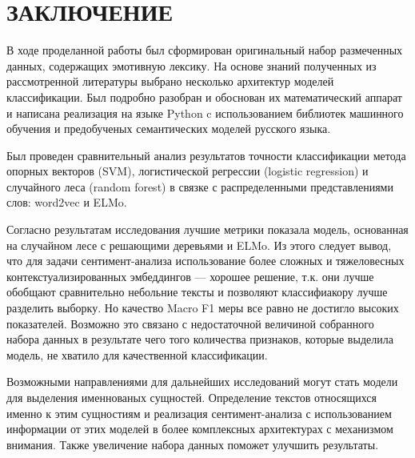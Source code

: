\chapter*{ЗАКЛЮЧЕНИЕ}

В ходе проделанной работы был сформирован оригинальный набор размеченных данных, содержащих эмотивную лексику. На основе знаний полученных из рассмотренной литературы выбрано несколько архитектур моделей классификации. Был подробно разобран и обоснован их математический аппарат и написана реализация на языке Python c использованием библиотек машинного обучения и предобученых семантических моделей русского языка.

\bigskip
Был проведен сравнительный анализ результатов точности классификации метода опорных векторов (SVM), логистической регрессии (logistic regression) и случайного леса (random forest) в связке с распределенными представлениями слов: word2vec и ELMo.

\bigskip
Согласно результатам исследования лучшие метрики показала модель, основанная на случайном лесе с решающими деревьями и ELMo. Из этого следует вывод, что для задачи сентимент-анализа использование более сложных и тяжеловесных контекстуализированных эмбеддингов --- хорошее решение, т.к. они лучше обобщают сравнительно небольние тексты и позволяют классифиакору лучше разделить выборку. Но качество Macro F1 меры все равно не достигло высоких показателей. Возможно это связано с недостаточной величиной собранного набора данных в результате чего того  количества признаков, которые выделила модель, не хватило для качественной классификации.

\bigskip
Возможными направлениями для дальнейших исследований могут стать модели для выделения именнованых сущностей. Определение текстов относящихся именно к этим сущностиям и реализация сентимент-анализа с использованием информации от этих моделей в более комплексных архитектурах с механизмом внимания. Также увеличение набора данных поможет улучшить результаты.
































